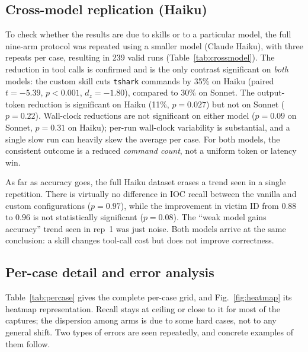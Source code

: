 \documentclass[conference]{IEEEtran}
\newcommand{\num}[1]{#1} %
\begin{document}
\subsection{Cross-model replication (Haiku)}
To check whether the results are due to skills or to a particular model, the full nine-arm
protocol was repeated using a smaller model (Claude Haiku), with three repeats per case,
resulting in \num{239} valid runs (Table~\ref{tab:crossmodel}). The reduction in tool calls
is confirmed and is the only contrast significant on \emph{both} models: the custom skill
cuts \texttt{tshark} commands by \num{35}\% on Haiku (paired $t{=}{-}5.39$, $p{<}0.001$,
$d_z{=}{-}1.80$), compared to \num{30}\% on Sonnet. The output-token reduction is
significant on Haiku (\num{11}\%, $p{=}0.027$) but not on Sonnet ($p{=}0.22$). Wall-clock
reductions are not significant on either model ($p{=}0.09$ on Sonnet, $p{=}0.31$ on Haiku);
per-run wall-clock variability is substantial, and a single slow run can heavily skew the
average per case. For both models, the consistent outcome is a reduced \emph{command count},
not a uniform token or latency win.

As far as accuracy goes, the full Haiku dataset erases a trend seen in a single repetition.
There is virtually no difference in IOC recall between the vanilla and custom configurations
($p{=}0.97$), while the improvement in victim ID from $0.88$ to $0.96$ is not statistically
significant ($p{=}0.08$). The ``weak model gains accuracy'' trend seen in rep~1 was just
noise. Both models arrive at the same conclusion: a skill changes tool-call cost but does
not improve correctness.

\begin{table}[t]
\caption{Cross-model comparison of vanilla (A) and the custom skill (C), case-level means
(Sonnet and Haiku, three reps each). The tool-call reduction is significant on both
models. The token reduction is significant on Haiku only, and the wall-clock reduction on
neither; Haiku A's wall-clock is inflated by a few slow runs ($p{=}0.31$). Accuracy does
not differ on either model.}
\label{tab:crossmodel}
\centering
\footnotesize

\end{table}

\subsection{Per-case detail and error analysis}
Table~\ref{tab:percase} gives the complete per-case grid, and Fig.~\ref{fig:heatmap} its
heatmap representation. Recall stays at ceiling or close to it for most of the captures; the
dispersion among arms is due to some hard cases, not to any general shift. Two types of
errors are seen repeatedly, and concrete examples of them follow.
\end{document}
